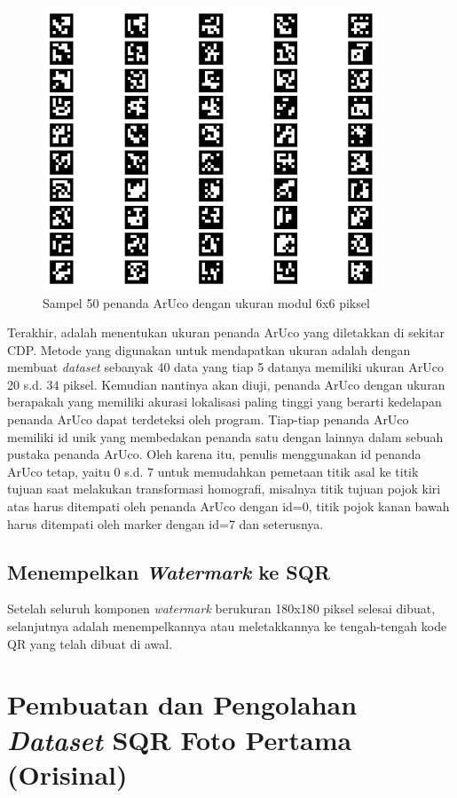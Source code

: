 \begin{figure}[h]
	\centering
	\includegraphics[width=10cm]{contents/chapter-3/3-aruco6x6.png}
	\caption{Sampel 50 penanda ArUco dengan ukuran modul 6x6 piksel}
	\label{Fig: 3-aruco6x6}
\end{figure}

Terakhir, adalah menentukan ukuran penanda ArUco yang diletakkan di sekitar CDP. Metode yang digunakan untuk mendapatkan ukuran adalah dengan membuat
\emph{dataset} sebanyak 40 data yang tiap 5 datanya memiliki ukuran ArUco 20 s.d. 34 piksel. Kemudian nantinya akan diuji, penanda ArUco dengan ukuran
berapakah yang memiliki akurasi lokalisasi paling tinggi yang berarti kedelapan penanda ArUco dapat terdeteksi oleh program. Tiap-tiap penanda ArUco memiliki
id unik yang membedakan penanda satu dengan lainnya dalam sebuah pustaka penanda ArUco. Oleh karena itu, penulis menggunakan id penanda ArUco tetap, yaitu 0
s.d. 7 untuk memudahkan pemetaan titik asal ke titik tujuan saat melakukan transformasi homografi, misalnya titik tujuan pojok kiri atas harus ditempati oleh
penanda ArUco dengan id=0, titik pojok kanan bawah harus ditempati oleh marker dengan id=7 dan seterusnya.

\subsection{Menempelkan \emph{Watermark} ke SQR} Setelah seluruh komponen \emph{watermark} berukuran 180x180 piksel selesai dibuat, selanjutnya adalah menempelkannya atau meletakkannya ke
tengah-tengah kode QR yang telah dibuat di awal.

\section{Pembuatan dan Pengolahan \emph{Dataset} SQR Foto Pertama (Orisinal)}
